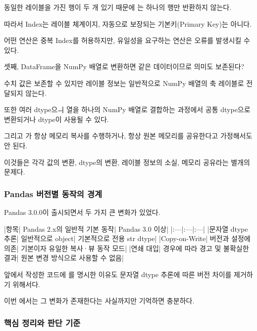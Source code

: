 동일한 레이블을 가진 행이 두 개 있기 때문에 는 하나의 행만 반환하지 않는다.

따라서 Index는 레이블 체계이지, 자동으로 보장되는 기본키(Primary Key)는 아니다.

어떤 연산은 중복 Index를 허용하지만, 유일성을 요구하는 연산은 오류를 발생시킬 수 있다.

\begin{dhknote}
\begin{dhksmry}[centered]
셋째, DataFrame을 NumPy 배열로 변환하면 
같은 데이터이므로 의미도 보존된다?
\end{dhksmry}
\end{dhknote}

수치 값은 보존할 수 있지만 레이블 정보는 일반적으로 NumPy 배열의 축 레이블로 전달되지 않는다.

또한 여러 dtype으ㅢ 열을 하나의 NumPy 배열로 결합하는 과정에서 공통 dtype으로 변환되거나  dtype이 사용될 수 있다.

그리고 가 항상 메모리 복사를 수행하거나, 항상 원본 메모리를 공유한다고 가정해서도 안 된다.

이것들은 각각 값의 변환, dtype의 변환, 레이블 정보의 소실, 메모리 공유라는 별개의 문제다.

\subsubsection{Pandas 버전별 동작의 경계}

Pandas 3.0.0이 출시되면서 두 가지 큰 변화가 있었다.

\begin{dhktable}
|항목|	Pandas 2.x의 일반적 기본 동작|	Pandas 3.0 이상|
|:---|:---|:---|
|문자열 dtype 추론|	일반적으로 object|	기본적으로 전용 str dtype|
|Copy-on-Write|	버전과 설정에 의존|	기본이자 유일한 복사·뷰 동작 모드|
|연쇄 대입|	경우에 따라 경고 및 불확실한 결과|	원본 변경 방식으로 사용할 수 없음|
\end{dhktable}

앞에서 작성한 코드에 를 명시한 이유도 문자열 dtype 추론에 따른 버전 차이를 제거하기 위해서다.

이번 에서는 그 변화가 존재한다는 사실까지만 기억하면 충분하다.

\subsubsection{핵심 정리와 판단 기준}

